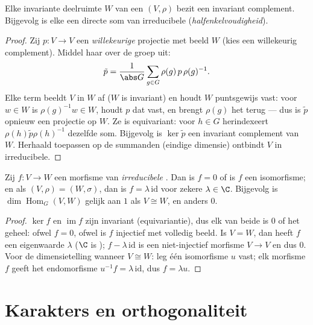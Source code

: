 \begin{theorem}[Maschke]\label{thm:b3:representations:maschke}
Elke invariante deelruimte $W$ van een  $(V, \rho)$
bezit een invariant complement. Bijgevolg is elke 
een directe som van irreducibele
(\emph{halfenkelvoudigheid}).
\end{theorem}

\begin{proof}
Zij $p \colon V \to V$ een \emph{willekeurige} projectie met beeld
$W$ (kies een willekeurig complement). Middel haar over de groep
uit:
\[
\tilde p = \frac1{\abs G}\sum_{g \in G} \rho(g)\,p\,\rho(g)^{-1}.
\]
Elke term beeldt $V$ in $W$ af ($W$ is invariant) en houdt $W$
puntsgewijs vast: voor $w \in W$ is $\rho(g)^{-1}w \in W$, houdt
$p$ dat vast, en brengt $\rho(g)$ het terug --- dus is $\tilde p$
opnieuw een projectie op $W$. Ze is equivariant: voor $h \in G$
herindexeert $\rho(h)\tilde p\rho(h)^{-1}$ dezelfde som. Bijgevolg
is $\ker \tilde p$ een invariant complement van $W$. Herhaald
toepassen op de summanden (eindige dimensie) ontbindt $V$ in
irreducibele.
\end{proof}

\begin{theorem}\label{thm:b3:representations:schur}
Zij $f \colon V \to W$ een morfisme van \emph{irreducibele}
. Dan is $f = 0$ of is $f$ een isomorfisme; en als
$(V,\rho) = (W,\sigma)$, dan is $f = \lambda\,\mathrm{id}$ voor
zekere $\lambda \in \C$. Bijgevolg is $\dim\operatorname{Hom}_G(V,
W)$ gelijk aan $1$ als $V \cong W$, en anders $0$.
\end{theorem}

\begin{proof}
$\ker f$ en $\operatorname{im} f$ zijn invariant (equivariantie),
dus elk van beide is $0$ of het geheel: ofwel $f = 0$, ofwel is
$f$ injectief met volledig beeld. Is $V = W$, dan heeft $f$ een
eigenwaarde $\lambda$ ($\C$ is ); $f -
\lambda\,\mathrm{id}$ is een niet-injectief morfisme $V \to V$ en
dus $0$. Voor de dimensietelling wanneer $V \cong W$: leg één
isomorfisme $u$ vast; elk morfisme $f$ geeft het endomorfisme
$u^{-1}f = \lambda\,\mathrm{id}$, dus $f = \lambda u$.
\end{proof}

\section{Karakters en orthogonaliteit}


